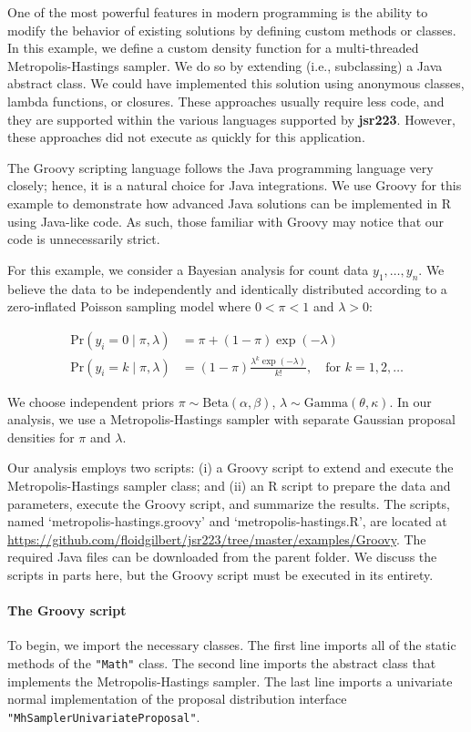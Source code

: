 \documentclass[
article,
11pt, %
a4paper, %
oneside, %
headinclude,footinclude, %
]{scrartcl}
\theoremstyle{definition} %
\theoremstyle{plain} %
\theoremstyle{remark} %
\newcommand{\pkg}[1]{\textbf{#1}}
\newcommand{\code}[1]{\texttt{#1}}
\newcommand{\file}[1]{{`\normalfont\textsf{#1}'}}
\begin{document}
One of the most powerful features in modern programming is the ability to modify the behavior of existing solutions by defining custom methods or classes. In this example, we define a custom density function for a multi-threaded Metropolis-Hastings sampler. We do so by extending (i.e., subclassing) a Java abstract class. We could have implemented this solution using anonymous classes, lambda functions, or closures. These approaches usually require less code, and they are supported within the various languages supported by \pkg{jsr223}. However, these approaches did not execute as quickly for this application.

The Groovy scripting language follows the Java programming language very closely; hence, it is a natural choice for Java integrations. We use Groovy for this example to demonstrate how advanced Java solutions can be implemented in R using Java-like code. As such, those familiar with Groovy may notice that our code is unnecessarily strict.

For this example, we consider a Bayesian analysis for count data $y_1,\dots,y_n$. We believe the data to be independently and identically distributed according to a zero-inflated Poisson sampling model where $0 < \pi < 1$ and $\lambda > 0$:

\begin{align*}
\text{Pr}(y_i = 0 \mid \pi, \lambda) &= \pi + (1-\pi) \exp(-\lambda) \\
\text{Pr}(y_i = k \mid \pi, \lambda) &= (1  -\pi) \frac{\lambda^k \exp(-\lambda)}{k!}, \quad \text{for } k = 1, 2, \ldots
\end{align*}

We choose independent priors $\pi \sim \text{Beta}(\alpha,\beta)$, $\lambda \sim \text{Gamma}(\theta,\kappa)$. In our analysis, we use a Metropolis-Hastings sampler with separate Gaussian proposal densities for $\pi$ and $\lambda$.

Our analysis employs two scripts: (i) a Groovy script to extend and execute the Metropolis-Hastings sampler class; and (ii) an R script to prepare the data and parameters, execute the Groovy script, and summarize the results. The scripts, named \file{metropolis-hastings.groovy} and \file{metropolis-hastings.R}, are located at \url{https://github.com/floidgilbert/jsr223/tree/master/examples/Groovy}. The required Java files can be downloaded from the parent folder. We discuss the scripts in parts here, but the Groovy script must be executed in its entirety.

\paragraph{The Groovy script} To begin, we import the necessary classes. The first line imports all of the static methods of the \code{"Math"} class. The second line imports the abstract class that implements the Metropolis-Hastings sampler. The last line imports a univariate normal implementation of the proposal distribution interface \code{"MhSamplerUnivariateProposal"}.
\end{document}
